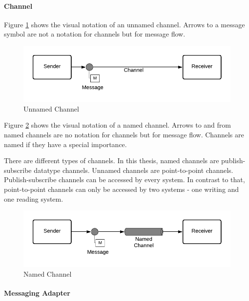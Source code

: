 \paragraph{Channel}

Figure \ref{messaging:channel1} shows the visual notation of an unnamed channel. Arrows to a message symbol are not a notation for channels but for message flow.

\begin{figure}[H]
    \centering
    \includegraphics[scale=0.6]{Diagrams/Messaging/3. Channel.pdf}
    \caption{Unnamed Channel}
    \label{messaging:channel1}
\end{figure}

Figure \ref{messaging:channel2} shows the visual notation of a named channel. Arrows to and from named channels are no notation for channels but for message flow. Channels are named if they have a special importance.

There are different types of channels. In this thesis, named channels are publish-subscribe datatype channels. Unnamed channels are point-to-point channels. Publish-subscribe channels can be accessed by every system. In contrast to that, point-to-point channels can only be accessed by two systems - one writing and one reading system.

\begin{figure}[H]
    \centering
    \includegraphics[scale=0.6]{Diagrams/Messaging/2. Channel.pdf}
    \caption{Named Channel}
    \label{messaging:channel2}
\end{figure}

\paragraph{Messaging Adapter}

